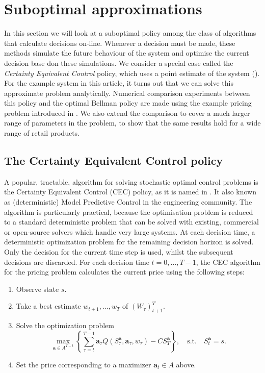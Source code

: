 \documentclass[main.tex]{subfiles}
\begin{document}
\listoftodos

\section{Suboptimal
  approximations}\label{sec:suboptimal_approximations}
In this section we will look at a suboptimal policy among the class of
algorithms that calculate decisions on-line.
Whenever a decision must be made, these methods simulate the future
behaviour of the system and optimise the current decision base don
these simulations.
We consider a special case called the
\emph{Certainty Equivalent Control} policy, which uses a point
estimate of the system (\citet[Ch.~6]{bertsekas2005dynamic}).
For the example system in this article, it turns out that we can solve
this approximate problem analytically.
Numerical comparison experiments between this policy and the optimal
Bellman policy are
made using the example pricing problem introduced in
. We also extend the comparison to
cover a much larger range of parameters in the problem, to show that
the same results hold for a wide range of retail products.

\subsection{The Certainty Equivalent Control policy}
A popular, tractable, algorithm for solving stochastic optimal control
problems is the Certainty Equivalent Control (CEC) policy, as it is
named in \citet{bertsekas2005dynamic}.
It also known as (deterministic) Model
Predictive Control in the engineering community.
The algorithm is particularly practical, because the optimisation
problem is reduced to a standard deterministic problem that can
be solved with existing, commercial or open-source solvers which
handle very large systems.
At each decision time, a deterministic optimization problem for the
remaining decision horizon is solved. Only the decision for the
current time step is
used, whilst the subsequent decisions are discarded.
For each decision time $t=0,\dots,T-1$, the CEC algorithm for the pricing
problem calculates the current price using the following steps:
\begin{enumerate}
\item Observe state $s$.
\item Take a best estimate $w_{t+1},\dots,w_T$ of ${(W_\tau)}_{t+1}^T$.
\item Solve the optimization problem
  \begin{equation}
    \max_{\mathbf a\in A^{T-t}}\left\{\sum_{\tau=t}^{T-1}\mathbf
      a_\tau Q(S_\tau^{\mathbf a},\mathbf
      a_\tau,w_{\tau})-CS_T^{\mathbf a}\right\},
    \quad \text{s.t.}\quad S_t^{\mathbf a}=s.
  \end{equation}
\item Set the price corresponding to a maximizer
  $\mathbf a_t\in A$ above.
\end{enumerate}
\end{document}
